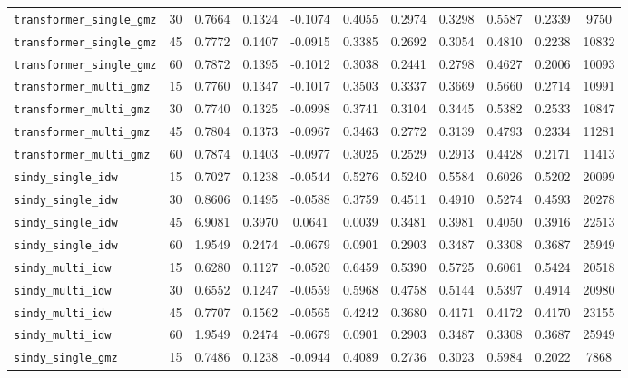 \documentclass[12pt, a4paper]{article}
\begin{document}
{\begin{longtable}{p{4.0cm}cccccccccc}
\texttt{transformer\_single\_gmz} & 30 & 0.7664 & 0.1324 & -0.1074 & 0.4055 & 0.2974 & 0.3298 & 0.5587 & 0.2339 & 9750 \\
\texttt{transformer\_single\_gmz} & 45 & 0.7772 & 0.1407 & -0.0915 & 0.3385 & 0.2692 & 0.3054 & 0.4810 & 0.2238 & 10832 \\
\texttt{transformer\_single\_gmz} & 60 & 0.7872 & 0.1395 & -0.1012 & 0.3038 & 0.2441 & 0.2798 & 0.4627 & 0.2006 & 10093 \\
\addlinespace[1pt]
\texttt{transformer\_multi\_gmz} & 15 & 0.7760 & 0.1347 & -0.1017 & 0.3503 & 0.3337 & 0.3669 & 0.5660 & 0.2714 & 10991 \\
\texttt{transformer\_multi\_gmz} & 30 & 0.7740 & 0.1325 & -0.0998 & 0.3741 & 0.3104 & 0.3445 & 0.5382 & 0.2533 & 10847 \\
\texttt{transformer\_multi\_gmz} & 45 & 0.7804 & 0.1373 & -0.0967 & 0.3463 & 0.2772 & 0.3139 & 0.4793 & 0.2334 & 11281 \\
\texttt{transformer\_multi\_gmz} & 60 & 0.7874 & 0.1403 & -0.0977 & 0.3025 & 0.2529 & 0.2913 & 0.4428 & 0.2171 & 11413 \\
\addlinespace[1pt]
\texttt{sindy\_single\_idw} & 15 & 0.7027 & 0.1238 & -0.0544 & 0.5276 & 0.5240 & 0.5584 & 0.6026 & 0.5202 & 20099 \\
\texttt{sindy\_single\_idw} & 30 & 0.8606 & 0.1495 & -0.0588 & 0.3759 & 0.4511 & 0.4910 & 0.5274 & 0.4593 & 20278 \\
\texttt{sindy\_single\_idw} & 45 & 6.9081 & 0.3970 & 0.0641 & 0.0039 & 0.3481 & 0.3981 & 0.4050 & 0.3916 & 22513 \\
\texttt{sindy\_single\_idw} & 60 & 1.9549 & 0.2474 & -0.0679 & 0.0901 & 0.2903 & 0.3487 & 0.3308 & 0.3687 & 25949 \\
\addlinespace[1pt]
\texttt{sindy\_multi\_idw} & 15 & 0.6280 & 0.1127 & -0.0520 & 0.6459 & 0.5390 & 0.5725 & 0.6061 & 0.5424 & 20518 \\
\texttt{sindy\_multi\_idw} & 30 & 0.6552 & 0.1247 & -0.0559 & 0.5968 & 0.4758 & 0.5144 & 0.5397 & 0.4914 & 20980 \\
\texttt{sindy\_multi\_idw} & 45 & 0.7707 & 0.1562 & -0.0565 & 0.4242 & 0.3680 & 0.4171 & 0.4172 & 0.4170 & 23155 \\
\texttt{sindy\_multi\_idw} & 60 & 1.9549 & 0.2474 & -0.0679 & 0.0901 & 0.2903 & 0.3487 & 0.3308 & 0.3687 & 25949 \\
\addlinespace[1pt]
\texttt{sindy\_single\_gmz} & 15 & 0.7486 & 0.1238 & -0.0944 & 0.4089 & 0.2736 & 0.3023 & 0.5984 & 0.2022 & 7868 \\

\end{longtable}}
\end{document}
